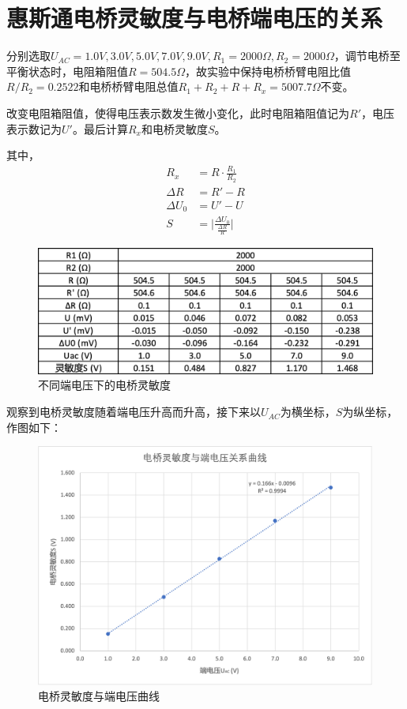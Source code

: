 \documentclass{article}
\begin{document}
\section{惠斯通电桥灵敏度与电桥端电压的关系}
分别选取$U_{AC} = 1.0 V, 3.0 V, 5.0 V, 7.0 V, 9.0 V, R_1 = 2000 \Omega, R_2 = 2000 \Omega$，调节电桥至平衡状态时，电阻箱阻值$R = 504.5 \Omega$，故实验中保持电桥桥臂电阻比值$R/R_2 = 0.2522$和电桥桥臂电阻总值$R_1 + R_2 + R + R_x = 5007.7 \Omega$不变。

改变电阻箱阻值，使得电压表示数发生微小变化，此时电阻箱阻值记为$R'$，电压表示数记为$U'$。最后计算$R_x$和电桥灵敏度$S$。

其中，
\begin{align*}
    R_x &= R \cdot \frac{R_1}{R_2} \\
    \Delta R &= R' - R \\
    \Delta U_0 &= U' - U \\
    S &= \lvert \frac{\Delta U_0}{\frac{\Delta R}{R}} \rvert
\end{align*}

\begin{figure}[htbp]
    \centering
    \includegraphics[width=1.0\textwidth]{2-1.png}
    \caption{不同端电压下的电桥灵敏度}
\end{figure}

观察到电桥灵敏度随着端电压升高而升高，接下来以$U_{AC}$为横坐标，$S$为纵坐标，作图如下：
\begin{figure}[htbp]
    \centering
    \includegraphics[width=1.0\textwidth]{2-2.png}
    \caption{电桥灵敏度与端电压曲线}
\end{figure}
\end{document}
